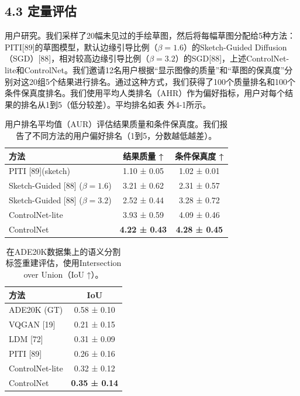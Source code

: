 \documentclass[a4paper,AutoFakeBold,oneside,12pt]{book}
\begin{document}
\begin{nopagenumber}
\section*{4.3\quad{} 定量评估}
用户研究。我们采样了20幅未见过的手绘草图，然后将每幅草图分配给5种方法：PITI[89]的草图模型，默认边缘引导比例（\(\beta = 1.6\)）的Sketch-Guided Diffusion（SGD）[88]，相对较高边缘引导比例（\(\beta = 3.2\)）的SGD[88]，上述ControlNet-lite和ControlNet。我们邀请12名用户根据“显示图像的质量”和“草图的保真度”分别对这20组5个结果进行排名。通过这种方式，我们获得了100个质量排名和100个条件保真度排名。我们使用平均人类排名（AHR）作为偏好指标，用户对每个结果的排名从1到5（低分较差）。平均排名如表 外4-1所示。
\begin{table}[ht]
    \centering
    \begin{tabular}{l c c}
        \hline
        \textbf{方法} & \textbf{结果质量 ↑} & \textbf{条件保真度 ↑} \\
        \hline
        PITI [89](sketch) & 1.10 ± 0.05 & 1.02 ± 0.01 \\
        Sketch-Guided [88] (\(\beta = 1.6\)) & 3.21 ± 0.62 & 2.31 ± 0.57 \\
        Sketch-Guided [88] (\(\beta = 3.2\)) & 2.52 ± 0.44 & 3.28 ± 0.72 \\
        ControlNet-lite & 3.93 ± 0.59 & 4.09 ± 0.46 \\
        ControlNet & \textbf{4.22 ± 0.43} & \textbf{4.28 ± 0.45} \\
        \hline
    \end{tabular}
    \caption{用户排名平均值（AUR）评估结果质量和条件保真度。我们报告了不同方法的用户偏好排名（1到5，分数越低越差）。}
    \label{tab:user-ranking}
\end{table}



\begin{table}[ht]
    \centering
    \begin{tabular}{|l|c|}
        \hline
        \textbf{方法} & \textbf{IoU} \\
        \hline
        ADE20K (GT) & 0.58 ± 0.10 \\
        VQGAN [19] & 0.21 ± 0.15 \\
        LDM [72] & 0.31 ± 0.09 \\
        PITI [89] & 0.26 ± 0.16 \\
        ControlNet-lite & 0.32 ± 0.12 \\
        ControlNet & \textbf{0.35 ± 0.14} \\
        \hline
    \end{tabular}
    \caption{在ADE20K数据集上的语义分割标签重建评估，使用Intersection over Union（IoU ↑）。}
    \label{tab:ade20k-eval}
\end{table}


\end{nopagenumber}
\end{document}
